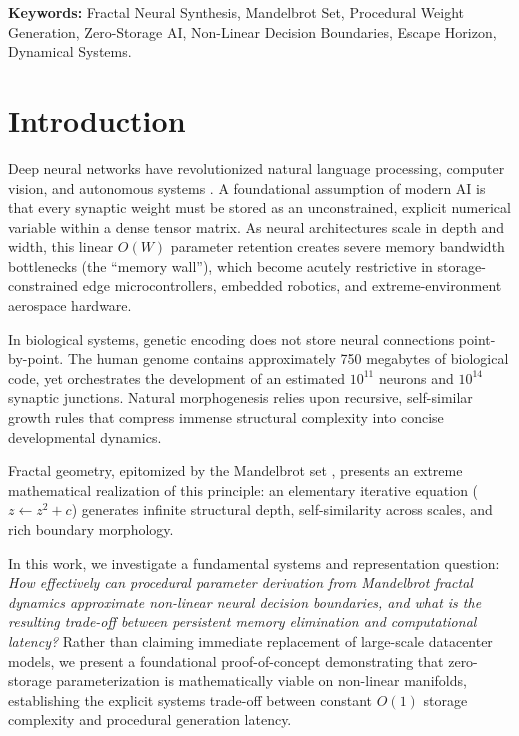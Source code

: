 \documentclass[10pt,journal,compsoc,twocolumn]{article}
\begin{document}
\vspace{0.2cm}
\noindent\textbf{Keywords:} Fractal Neural Synthesis, Mandelbrot Set, Procedural Weight Generation, Zero-Storage AI, Non-Linear Decision Boundaries, Escape Horizon, Dynamical Systems.



\section{Introduction}
Deep neural networks have revolutionized natural language processing, computer vision, and autonomous systems \cite{vaswani2017attention}. A foundational assumption of modern AI is that every synaptic weight must be stored as an unconstrained, explicit numerical variable within a dense tensor matrix. As neural architectures scale in depth and width, this linear $O(W)$ parameter retention creates severe memory bandwidth bottlenecks (the ``memory wall''), which become acutely restrictive in storage-constrained edge microcontrollers, embedded robotics, and extreme-environment aerospace hardware.

In biological systems, genetic encoding does not store neural connections point-by-point. The human genome contains approximately 750 megabytes of biological code, yet orchestrates the development of an estimated $10^{11}$ neurons and $10^{14}$ synaptic junctions. Natural morphogenesis relies upon recursive, self-similar growth rules that compress immense structural complexity into concise developmental dynamics.

Fractal geometry, epitomized by the Mandelbrot set \cite{mandelbrot1980fractal, mandelbrot1982fractal}, presents an extreme mathematical realization of this principle: an elementary iterative equation ($z \leftarrow z^2 + c$) generates infinite structural depth, self-similarity across scales, and rich boundary morphology. 

In this work, we investigate a fundamental systems and representation question: \textit{How effectively can procedural parameter derivation from Mandelbrot fractal dynamics approximate non-linear neural decision boundaries, and what is the resulting trade-off between persistent memory elimination and computational latency?} Rather than claiming immediate replacement of large-scale datacenter models, we present a foundational proof-of-concept demonstrating that zero-storage parameterization is mathematically viable on non-linear manifolds, establishing the explicit systems trade-off between constant $O(1)$ storage complexity and procedural generation latency.
\end{document}
